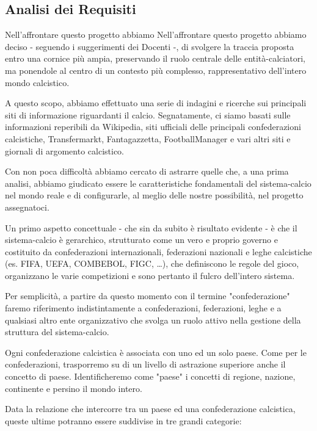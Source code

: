 \subsection{Analisi dei Requisiti}

Nell'affrontare questo progetto abbiamo Nell'affrontare questo progetto abbiamo deciso - seguendo i suggerimenti dei Docenti -, di svolgere
la traccia proposta entro una cornice più ampia, preservando il ruolo centrale delle entità-calciatori,
ma ponendole al centro di un contesto più complesso, rappresentativo dell'intero mondo calcistico.

A questo scopo, abbiamo effettuato una serie di indagini e ricerche sui principali siti di informazione riguardanti il calcio. Segnatamente, ci siamo basati sulle informazioni reperibili da Wikipedia, siti ufficiali delle principali confederazioni calcistiche, Transfermarkt, Fantagazzetta, FootballManager e vari altri siti e giornali di argomento calcistico.

Con non poca difficoltà abbiamo cercato di astrarre quelle che, a una prima analisi, abbiamo giudicato essere le
caratteristiche fondamentali del sistema-calcio nel mondo reale e di configurarle, al meglio delle nostre
possibilità, nel progetto assegnatoci.

\bigskip
\bigskip

Un primo aspetto concettuale - che sin da subito è risultato evidente - è che il sistema-calcio è
gerarchico, strutturato come un vero e proprio governo e costituito da confederazioni internazionali,
federazioni nazionali e leghe calcistiche (es. FIFA, UEFA, COMBEBOL, FIGC, \dots), che definiscono
le regole del gioco, organizzano le varie competizioni e sono pertanto il fulcro dell'intero sistema.

Per semplicità, a partire da questo momento con il termine "confederazione" faremo
riferimento indistintamente a confederazioni, federazioni, leghe e a qualsiasi altro ente
organizzativo che svolga un ruolo attivo nella gestione della struttura del sistema-calcio.

Ogni confederazione calcistica è associata con uno ed un solo paese.
\newline
Come per le confederazioni, trasporremo su di un livello di astrazione superiore anche il concetto di paese.
Identificheremo come "paese" i concetti di regione, nazione, continente e persino il mondo intero.

Data la relazione che intercorre tra un paese ed una confederazione calcistica, queste ultime
potranno essere suddivise in tre grandi categorie:

